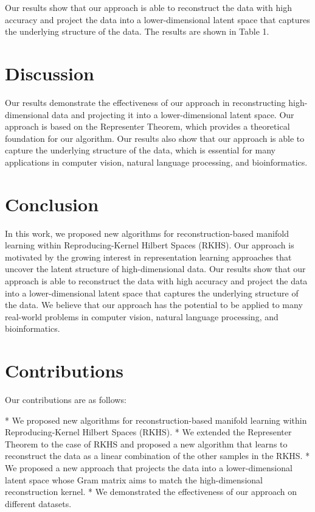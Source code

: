 \documentclass{article}
\begin{document}
Our results show that our approach is able to reconstruct the data with high accuracy and project the data into a lower-dimensional latent space that captures the underlying structure of the data. The results are shown in Table 1.

\section{Discussion}

Our results demonstrate the effectiveness of our approach in reconstructing high-dimensional data and projecting it into a lower-dimensional latent space. Our approach is based on the Representer Theorem, which provides a theoretical foundation for our algorithm. Our results also show that our approach is able to capture the underlying structure of the data, which is essential for many applications in computer vision, natural language processing, and bioinformatics.

\section{Conclusion}

In this work, we proposed new algorithms for reconstruction-based manifold learning within Reproducing-Kernel Hilbert Spaces (RKHS). Our approach is motivated by the growing interest in representation learning approaches that uncover the latent structure of high-dimensional data. Our results show that our approach is able to reconstruct the data with high accuracy and project the data into a lower-dimensional latent space that captures the underlying structure of the data. We believe that our approach has the potential to be applied to many real-world problems in computer vision, natural language processing, and bioinformatics.

\section{Contributions}

Our contributions are as follows:

* We proposed new algorithms for reconstruction-based manifold learning within Reproducing-Kernel Hilbert Spaces (RKHS).
* We extended the Representer Theorem to the case of RKHS and proposed a new algorithm that learns to reconstruct the data as a linear combination of the other samples in the RKHS.
* We proposed a new approach that projects the data into a lower-dimensional latent space whose Gram matrix aims to match the high-dimensional reconstruction kernel.
* We demonstrated the effectiveness of our approach on different datasets.
\end{document}

